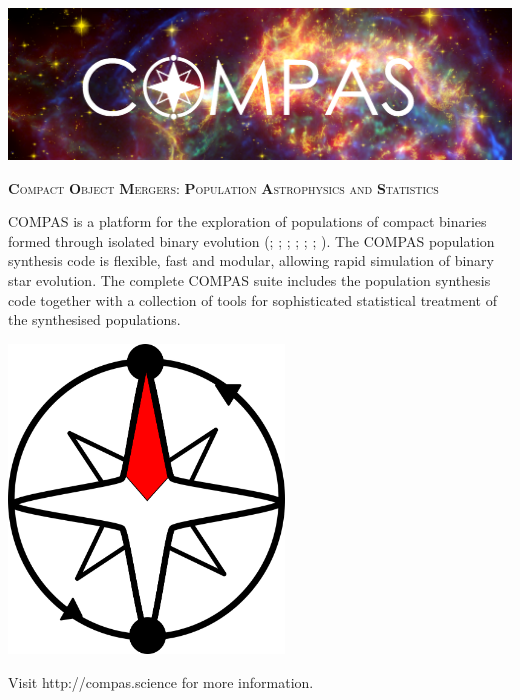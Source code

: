 \noindent\includegraphics[width=1.0\textwidth]{sections/images/COMPAS_hdr.png}

\bigskip\bigskip

\begingroup
    \LARGE
    \centerline{
        \textbf{C}\textsc{ompact} \textbf{O}\textsc{bject} \textbf{M}\textsc{ergers}: \textbf{P}\textsc{opulation} \textbf{A}\textsc{strophysics and} \textbf{S}\textsc{tatistics}
    }
\endgroup

\bigskip\bigskip
COMPAS is a platform for the exploration of populations of compact binaries formed through isolated binary evolution (\citet{Stevenson_2017}; \citet{Vigna_Gomez_2018}; \citet{Barrett_2018}; \citet{Neijssel_2019}; \citet{Broekgaarden_2019}; \citet{Stevenson_2019}; \citet{Chattopadhyay_2020}). The COMPAS population synthesis code is flexible, fast and modular, allowing rapid simulation of binary star evolution.  The complete COMPAS suite includes the population synthesis code together with a collection of tools for sophisticated statistical treatment of the synthesised populations.

\bigskip
\begin{center}
    \includegraphics[width=0.55\textwidth]{sections/images/COMPAS_logo.png}
\end{center}

\bigskip
\centerline{Visit http://compas.science for more information.}
